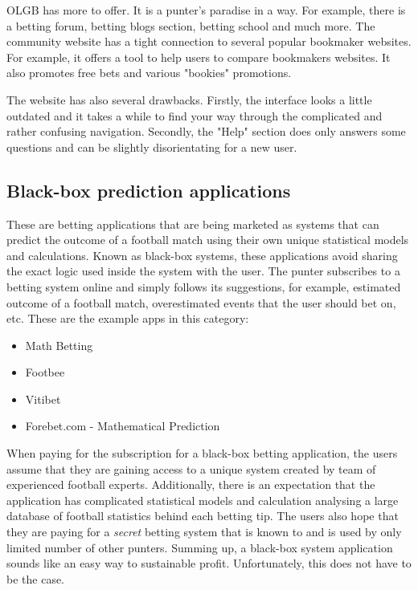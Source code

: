OLGB has more to offer. It is a punter's paradise in a way. For example, there is a betting forum, betting blogs section, betting school and much more. The community website has a tight connection to several popular bookmaker websites. For example, it offers a tool to help users to compare bookmakers websites. It also promotes free bets and various "bookies" promotions.

The website has also several drawbacks. Firstly, the interface looks a little outdated and it takes a while to find your way through the complicated and rather confusing navigation. Secondly, the "Help" section does only answers some questions and can be slightly disorientating for a new user.

\subsection{Black-box prediction applications}
\label{subsec:blackboxapplications_req}
These are betting applications that are being marketed as systems that can predict the outcome of a football match using their own unique statistical models and calculations. Known as black-box systems, these applications avoid sharing the exact logic used inside the system with the user. The punter subscribes to a betting system online and simply follows its suggestions, for example, estimated outcome of a football match, overestimated events that the user should bet on, etc. These are the example apps in this category:

\begin{itemize}
	\item Math Betting \citep{source:mathbetting}
	\item Footbee \citep{source:footbee}
	\item Vitibet \citep{source:vitibet}
	\item Forebet.com - Mathematical Prediction \citep{source:forebet}
\end{itemize}

When paying for the subscription for a black-box betting application, the users assume that they are gaining access to a unique system created by team of experienced football experts. Additionally, there is an expectation that the application has complicated statistical models and calculation analysing a large database of football statistics behind each betting tip. The users also hope that they are paying for a \emph{secret} betting system that is known to and is used by only limited number of other punters. Summing up, a black-box system application sounds like an easy way to sustainable profit. Unfortunately, this does not have to be the case. 

